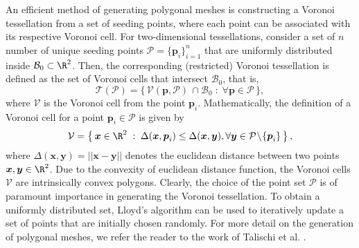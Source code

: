 An efficient method of generating polygonal meshes is constructing a Voronoi tessellation from a set of seeding points, where each point can be associated with its respective Voronoi cell. For two-dimensional tessellations, consider a set of $n$ number of unique seeding points $\mathcal{P} = \{ \boldsymbol{p}_i \}^n_{i = 1}$ that are uniformly distributed inside $\mathcal{B}_0 \subset \R^2$. Then, the corresponding (restricted) Voronoi tessellation is defined as the set of Voronoi cells that intersect $\mathcal{B}_0$, that is, 
\begin{equation}
	\mathcal{T}(\mathcal{P}) = \big\{\, \mathcal{V}(\boldsymbol{p},\mathcal{P}) \,\cap \mathcal{B}_0 \;:\; \forall \boldsymbol{p} \in \mathcal{P} \,\big\},
\end{equation}
where $\mathcal{V}$ is the Voronoi cell from the point $\boldsymbol{p}_i$. Mathematically, the definition of a Voronoi cell for a point $\boldsymbol{p}_i \in \mathcal{P}$ is given by
\begin{equation}
\mathcal{V} = \left\{\, \boldsymbol{x}\in \R^2 \;:\; \Delta(\boldsymbol{x},\boldsymbol{p}_i) \le \Delta(\boldsymbol{x},\boldsymbol{y}), \forall \boldsymbol{y} \in \mathcal{P}\!\setminus\!\{\boldsymbol{p}_i\}  \,\right\}, \label{eq:vorcell}
\end{equation}
where $\Delta(\boldsymbol{x},\boldsymbol{y}) = ||\boldsymbol{x} -  \boldsymbol{y}||$ denotes the euclidean distance between two points $\boldsymbol{x},\boldsymbol{y}\in \R^2$. Due to the convexity of euclidean distance function, the Voronoi cells $\mathcal{V}$ are intrinsically convex polygons. Clearly, the choice of the point set $\mathcal{P}$ is of paramount importance in generating the Voronoi tessellation. To obtain a uniformly distributed set, Lloyd's algorithm can be used to iteratively update a set of points that are initially chosen randomly. For more detail on the generation of polygonal meshes, we refer the reader to the work of Talischi et al. \cite{Talischi2012}.
